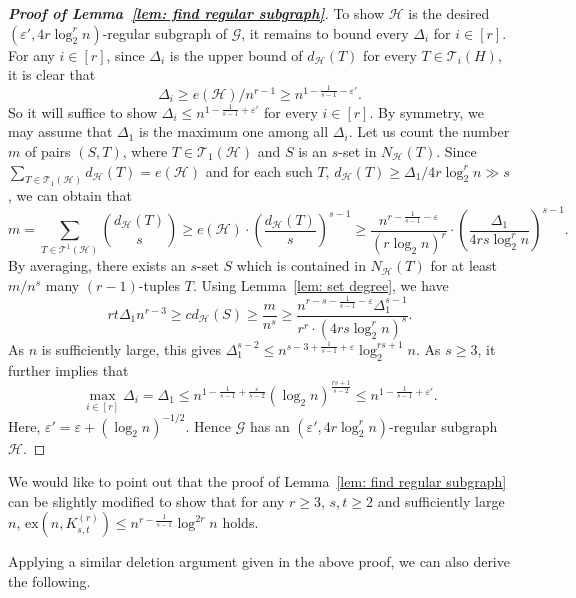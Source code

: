 \documentclass[11pt]{article}
\def\ex{\mathrm{ex}}
\begin{document}
\begin{proof}[\bf Proof of Lemma~\ref{lem: find regular subgraph}]
To show $\mathcal H$ is the desired $\left(\varepsilon',4r\log_2^r n\right)$-regular subgraph of $\mathcal G$,
it remains to bound every $\Delta_i$ for $i\in [r]$.
For any $i\in [r]$, since $\Delta_i$ is the upper bound of $d_{\mathcal H}(T)$ for every $T\in \mathcal T_i(H)$,
it is clear that $$\Delta_i\ge e(\mathcal H)/n^{r-1}\ge n^{1-\frac{1}{s-1}- \varepsilon'}.$$
So it will suffice to show $\Delta_i\leq n^{1-\frac{1}{s-1}+\varepsilon'}$ for every $i\in [r]$.
By symmetry, we may assume that $\Delta_1$ is the maximum one among all $\Delta_i$.
Let us count the number $m$ of pairs $(S, T)$,
where $T\in \mathcal T_1(\mathcal H)$  and $S$ is an $s$-set in $N_{\mathcal H}(T)$.
Since $\sum_{T\in \mathcal  T_1(\mathcal H) }d_{\mathcal H}(T)= e(\mathcal H)$ and for each such $T$,
$d_{\mathcal H}(T)\ge \Delta_1/ 4r\log_2^{r }n\gg s$,
we can obtain that
$$m=  \sum_{T\in \mathcal  T^1(\mathcal H)} \binom{d_{\mathcal H}(T)}{s}
\ge e(\mathcal H) \cdot \left(\frac{d_{\mathcal H}(T)}{s}\right)^{s-1}
\ge \frac{n^{r-\frac{1}{s-1}- \varepsilon}}{(r\log_2n)^r}\cdot \left(\frac{\Delta_1}{4rs\log_2^{r }n } \right)^{s-1}.$$
By averaging, there exists an $s$-set $S$ which is contained in $N_{\mathcal H}(T)$ for at least $m/n^{s}$ many $(r-1)$-tuples $T$.
Using Lemma~\ref{lem: set degree}, we have
$$rt\Delta_1 n^{ r-3}\ge  cd_{\mathcal H}(S) \ge \frac{m}{n^s }
\ge \frac{n^{r-s-\frac{1}{s-1}-\varepsilon}\Delta_1^{s-1}}{r^r\cdot (4rs\log_2^{r}n)^{s}}.$$
As $n$ is sufficiently large,
this gives $\Delta_1^{s-2}\le n^{s-3+\frac{1}{s-1}+\varepsilon}\log_2^{rs +1 }n$.
As $s\geq 3$, it further implies that
$$\max_{i\in [r]} \Delta_i=\Delta_1\le n^{1 -\frac{1}{s-1}+ \frac{\varepsilon}{s-2}}\left(\log_2 n\right)^{\frac{rs+1}{s-2}}\le n^{1 -\frac{1}{s-1}+ \varepsilon'}.$$
Here, $\varepsilon'= \varepsilon + (\log_2n)^{-1/2}$.
Hence $\mathcal G$ has an $(\varepsilon',4r\log_2^r n)$-regular subgraph $\mathcal H$.
\end{proof}

We would like to point out that the proof of Lemma~\ref{lem: find regular subgraph} can be slightly modified to show that for any $r\geq 3$, $s,t\geq 2$ and sufficiently large $n$,
$\ex(n,K^{(r)}_{s,t})\leq n^{r-\frac{1}{s-1}}\log^{2r} n$ holds.

Applying a similar deletion argument given in the above proof, we can also derive the following.
\end{document}

